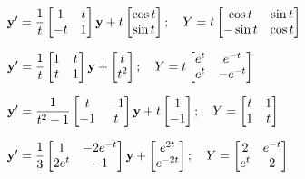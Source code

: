 \begin{exerciselist}

\item\label{exer:10.7.11}$\mathbf{y}'
=\dfrac{1}{t}\begin{bmatrix}1&t\\-t&1\end{bmatrix}\mathbf{y}
+t\begin{bmatrix}\cos t\\\sin t\end{bmatrix};  \quad Y
=t\begin{bmatrix}\cos t&\sin t\\-\sin t&\cos t\end{bmatrix}$

\item\label{exer:10.7.12}$\mathbf{y}'
=\dfrac{1}{t}\begin{bmatrix}1&t\\t&1\end{bmatrix}\mathbf{y}
+\begin{bmatrix}t\\t^2\end{bmatrix};  \quad Y
=t\begin{bmatrix}e^t&e^{-t}\\e^t&-e^{-t}\end{bmatrix}$

\item\label{exer:10.7.13}$\mathbf{y}'
=\dfrac{1}{t^2-1}\begin{bmatrix}t&-1\\-1&t\end{bmatrix}\mathbf{y}+
t\begin{bmatrix}1\\-1\end{bmatrix};  \quad
Y=\begin{bmatrix}t&1\\1&t\end{bmatrix}$

\item\label{exer:10.7.14}$\mathbf{y}'
=\dfrac{1}{3}\begin{bmatrix}1&-2e^{-t}\\2e^t&-1\end{bmatrix}\mathbf{y}+
\begin{bmatrix}e^{2t}\\e^{-2t}\end{bmatrix};  \quad
Y=\begin{bmatrix}2&e^{-t}\\e^t&2\end{bmatrix}$


\end{exerciselist}
